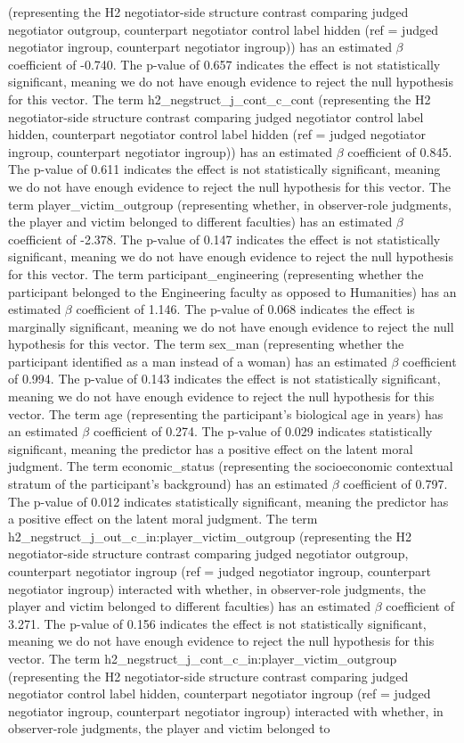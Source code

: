 \documentclass[11pt]{article}
\begin{document}
(representing the H2 negotiator-side structure contrast comparing judged negotiator outgroup, counterpart negotiator control label hidden (ref = judged negotiator ingroup, counterpart negotiator ingroup)) has an estimated $\beta$ coefficient of -0.740. The p-value of 0.657 indicates the effect is not statistically significant, meaning we do not have enough evidence to reject the null hypothesis for this vector. The term h2\_negstruct\_j\_cont\_c\_cont (representing the H2 negotiator-side structure contrast comparing judged negotiator control label hidden, counterpart negotiator control label hidden (ref = judged negotiator ingroup, counterpart negotiator ingroup)) has an estimated $\beta$ coefficient of 0.845. The p-value of 0.611 indicates the effect is not statistically significant, meaning we do not have enough evidence to reject the null hypothesis for this vector. The term player\_victim\_outgroup (representing whether, in observer-role judgments, the player and victim belonged to different faculties) has an estimated $\beta$ coefficient of -2.378. The p-value of 0.147 indicates the effect is not statistically significant, meaning we do not have enough evidence to reject the null hypothesis for this vector. The term participant\_engineering (representing whether the participant belonged to the Engineering faculty as opposed to Humanities) has an estimated $\beta$ coefficient of 1.146. The p-value of 0.068 indicates the effect is marginally significant, meaning we do not have enough evidence to reject the null hypothesis for this vector. The term sex\_man (representing whether the participant identified as a man instead of a woman) has an estimated $\beta$ coefficient of 0.994. The p-value of 0.143 indicates the effect is not statistically significant, meaning we do not have enough evidence to reject the null hypothesis for this vector. The term age (representing the participant's biological age in years) has an estimated $\beta$ coefficient of 0.274. The p-value of 0.029 indicates statistically significant, meaning the predictor has a positive effect on the latent moral judgment. The term economic\_status (representing the socioeconomic contextual stratum of the participant's background) has an estimated $\beta$ coefficient of 0.797. The p-value of 0.012 indicates statistically significant, meaning the predictor has a positive effect on the latent moral judgment. The term h2\_negstruct\_j\_out\_c\_in:player\_victim\_outgroup (representing the H2 negotiator-side structure contrast comparing judged negotiator outgroup, counterpart negotiator ingroup (ref = judged negotiator ingroup, counterpart negotiator ingroup) interacted with whether, in observer-role judgments, the player and victim belonged to different faculties) has an estimated $\beta$ coefficient of 3.271. The p-value of 0.156 indicates the effect is not statistically significant, meaning we do not have enough evidence to reject the null hypothesis for this vector. The term h2\_negstruct\_j\_cont\_c\_in:player\_victim\_outgroup (representing the H2 negotiator-side structure contrast comparing judged negotiator control label hidden, counterpart negotiator ingroup (ref = judged negotiator ingroup, counterpart negotiator ingroup) interacted with whether, in observer-role judgments, the player and victim belonged to 
\end{document}
